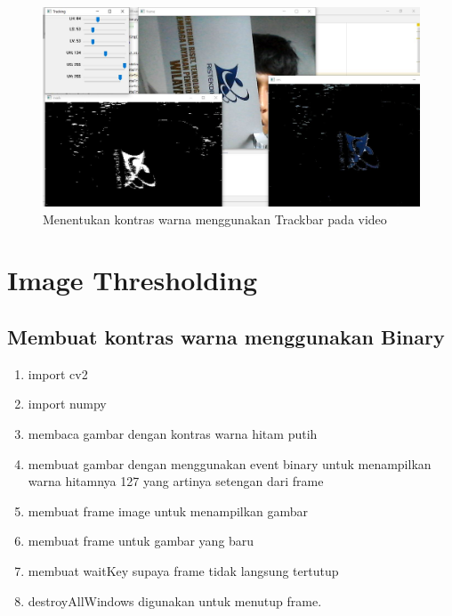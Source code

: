\newpage
\begin{figure}[ht]
\centering
\includegraphics[scale=0.35]{figures/2,37.jpg}
\caption{Menentukan kontras warna menggunakan Trackbar pada video}
\label{contoh}
\end{figure}



\newpage
\section{Image Thresholding}
\subsection{Membuat kontras warna menggunakan Binary}

\begin{enumerate}
	\item import cv2
	\item import numpy
	\item membaca gambar dengan kontras warna hitam putih
	\item membuat gambar dengan menggunakan event binary untuk menampilkan warna hitamnya 127 yang artinya setengan dari frame
	\item membuat frame image untuk menampilkan gambar
	\item membuat frame untuk gambar yang baru
	\item membuat waitKey supaya frame tidak langsung tertutup
	\item destroyAllWindows digunakan untuk menutup frame.
\end{enumerate}

